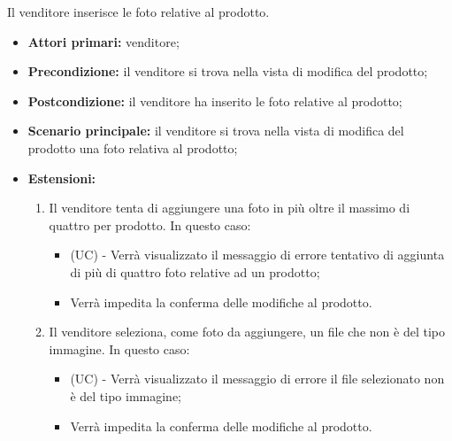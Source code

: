 Il venditore inserisce le foto relative al prodotto.
\begin{itemize}
    \item \textbf{Attori primari:} venditore;
    \item \textbf{Precondizione:} il venditore si trova nella vista di modifica del prodotto;
    \item \textbf{Postcondizione:} il venditore ha inserito le foto relative al prodotto;
    \item \textbf{Scenario principale:} il venditore si trova nella vista di modifica del prodotto una foto relativa al prodotto;
    \item \textbf{Estensioni:}
    \begin{enumerate}
    	\item Il venditore tenta di aggiungere una foto in più oltre il massimo di quattro per prodotto. In questo caso:
    	\begin{itemize}
    		\item (UC) - Verrà visualizzato il messaggio di errore tentativo di aggiunta di più di quattro foto relative ad un prodotto;
    		\item Verrà impedita la conferma delle modifiche al prodotto.
    	\end{itemize}
    	\item Il venditore seleziona, come foto da aggiungere, un file che non è del tipo immagine. In questo caso:
    	\begin{itemize}
    		\item (UC) - Verrà visualizzato il messaggio di errore il file selezionato non è del tipo immagine;
    		\item Verrà impedita la conferma delle modifiche al prodotto.
    	\end{itemize}
    \end{enumerate}
\end{itemize}

